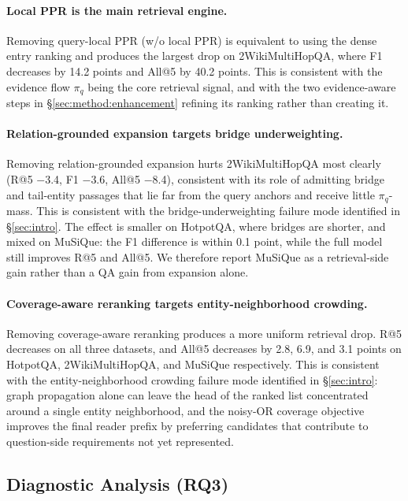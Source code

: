 \paragraph{Local PPR is the main retrieval engine.}
Removing query-local PPR (w/o local PPR) is equivalent to using the
dense entry ranking and produces the largest drop on 2WikiMultiHopQA,
where F1 decreases by 14.2 points and All@5 by 40.2 points. This is
consistent with the evidence flow $\pi_q$ being the core retrieval
signal, and with the two evidence-aware steps in
\S\ref{sec:method:enhancement} refining its ranking rather than creating it.

\paragraph{Relation-grounded expansion targets bridge underweighting.}
Removing relation-grounded expansion hurts 2WikiMultiHopQA most clearly
(R@5 $-$3.4, F1 $-$3.6, All@5 $-$8.4), consistent with its role of
admitting bridge and tail-entity passages that lie far from the query
anchors and receive little $\pi_q$-mass. This is consistent with the
bridge-underweighting failure mode identified in \S\ref{sec:intro}. The effect is smaller on
HotpotQA, where bridges are shorter, and mixed on MuSiQue: the F1
difference is within 0.1 point, while the full model still improves
R@5 and All@5. We therefore report MuSiQue as a retrieval-side gain
rather than a QA gain from expansion alone.

\paragraph{Coverage-aware reranking targets entity-neighborhood crowding.}
Removing coverage-aware reranking produces a more uniform retrieval
drop. R@5 decreases on all three datasets, and All@5 decreases by 2.8,
6.9, and 3.1 points on HotpotQA, 2WikiMultiHopQA, and MuSiQue
respectively. This is consistent with the entity-neighborhood
crowding failure mode identified in \S\ref{sec:intro}: graph
propagation alone can leave the head of the
ranked list concentrated around a single entity neighborhood, and the
noisy-OR coverage objective improves the final reader prefix by
preferring candidates that contribute to question-side requirements
not yet represented.

\subsection{Diagnostic Analysis (RQ3)}
\label{sec:experiments:analysis}

